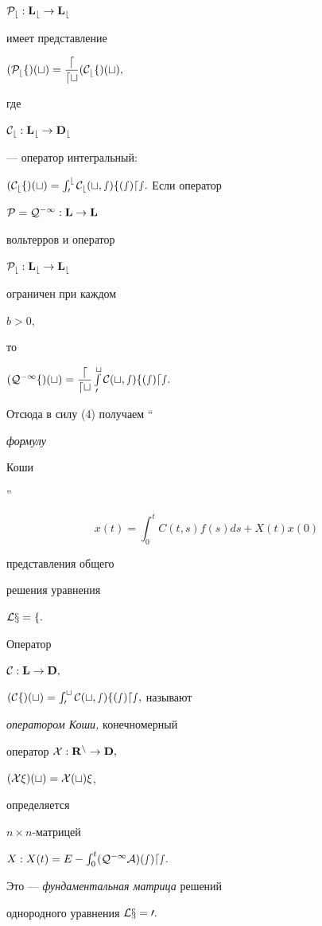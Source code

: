 $\cal P_b:\bold L_b\to\bold L_b$


имеет представление


$(\cal P_bf)(t) =\dfrac{d}{dt}(\cal C_bf)(t),$


где


$\cal C_b:\bold L_b\to\bold D_b$


--- оператор интегральный:


$(\cal C_bf)(t) =\int_0^b C_b (t,s)f(s)ds.$ Если оператор


$\cal P=\cal Q^{-1}:\bold L\to\bold L$


вольтерров и оператор


$\cal P_b:\bold L_b\to\bold L_b$


ограничен при каждом


$b>0,$


то


$(\cal Q^{-1}f)(t) =


\dfrac{d}{dt}\int\limits_0^t C(t,s) f(s) ds.$





Отсюда в силу (4) получаем ``{\it формулу


Коши}''


\begin{equation}


x(t) = \int_0^t C(t,s)f(s)ds +X(t)x(0)


\end{equation}


представления общего


решения уравнения


$\cal L x=f.$





Оператор


$\cal C:\bold L\to\bold D,$


$(\cal C f)(t) =\int_0^t C(t,s)f(s)ds,$ называют


{\it оператором Коши,} конечномерный


оператор $\cal X:\bold R^n\to\bold D,$


$(\cal X\xi)(t) = X(t)\xi$,


определяется


$n\times n$-матрицей


$X:X(t) = E-\int_0^t(\cal Q^{-1}A)(s)ds.$


Это --- {\it фундаментальная матрица} решений


однородного уравнения $\cal L x=0.$





